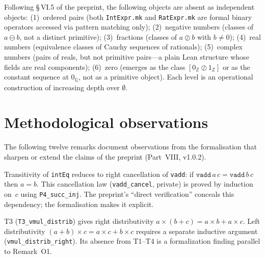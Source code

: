 \begin{remark}
\label{rem:VI5_list}
\leanok
{}
Following §\,VI.5 of the preprint, the following objects are absent as
independent objects:
(1)~ordered pairs (both \texttt{IntExpr.mk} and \texttt{RatExpr.mk}
    are formal binary operators accessed via pattern matching only);
(2)~negative numbers (classes of $a \ominus b$, not a distinct primitive);
(3)~fractions (classes of $a \oslash b$ with $b \ne 0$);
(4)~real numbers (equivalence classes of Cauchy sequences of rationals);
(5)~complex numbers (pairs of reals, but not primitive pairs---a
    plain Lean structure whose fields are real components);
(6)~zero (emerges as the class $[0_{\mathbb{Z}} \oslash 1_{\mathbb{Z}}]$ or as the
    constant sequence at $0_{\mathbb{Q}}$, not as a primitive object).
Each level is an operational construction of increasing depth over $\emptyset$.
\end{remark}

\section{Methodological observations}
\label{sec:numbers_method}

The following twelve remarks document observations from the formalisation
that sharpen or extend the claims of the preprint (Part~VIII, v1.0.2).

\begin{remark}
\label{rem:vadd_cancel}
\leanok
{}
Transitivity of \texttt{intEq} reduces to right cancellation of \texttt{vadd}:
if $\texttt{vadd}\,a\,c = \texttt{vadd}\,b\,c$ then $a = b$.  This cancellation
law (\texttt{vadd\_cancel}, private) is proved by induction on~$c$ using
\texttt{P4\_succ\_inj}.  The preprint's ``direct verification'' conceals this
dependency; the formalisation makes it explicit.
\end{remark}

\begin{remark}
\label{rem:vmul_distrib}
\leanok
{}
T3 (\texttt{T3\_vmul\_distrib}) gives right distributivity
$a \times (b + c) = a \times b + a \times c$.
Left distributivity $(a + b) \times c = a \times c + b \times c$
requires a separate inductive argument (\texttt{vmul\_distrib\_right}).
Its absence from T1--T4 is a formalization finding parallel to
Remark~O1.
\end{remark}

